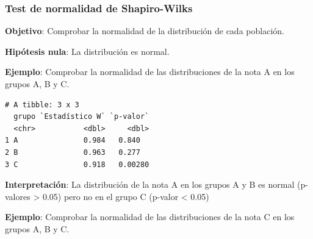 \documentclass[
  spanish,
  a4paper,
]{scrreport}
\newenvironment{Shaded}{\begin{snugshade}}{\end{snugshade}}
\newcommand{\AttributeTok}[1]{\textcolor[rgb]{0.40,0.45,0.13}{#1}}
\newcommand{\FunctionTok}[1]{\textcolor[rgb]{0.28,0.35,0.67}{#1}}
\newcommand{\NormalTok}[1]{\textcolor[rgb]{0.00,0.23,0.31}{#1}}
\newcommand{\OtherTok}[1]{\textcolor[rgb]{0.00,0.23,0.31}{#1}}
\newcommand{\SpecialCharTok}[1]{\textcolor[rgb]{0.37,0.37,0.37}{#1}}
\newcommand{\StringTok}[1]{\textcolor[rgb]{0.13,0.47,0.30}{#1}}
\theoremstyle{definition}
\theoremstyle{definition}
\theoremstyle{remark}
\begin{document}
\subsubsection{Test de normalidad de
Shapiro-Wilks}\label{test-de-normalidad-de-shapiro-wilks-2}

\textbf{Objetivo}: Comprobar la normalidad de la distribución de cada
población.

\textbf{Hipótesis nula}: La distribución es normal.

\textbf{Ejemplo}: Comprobar la normalidad de las distribuciones de la
nota A en los grupos A, B y C.

\begin{Shaded}
\end{Shaded}

\begin{verbatim}
# A tibble: 3 x 3
  grupo `Estadístico W` `p-valor`
  <chr>           <dbl>     <dbl>
1 A               0.984   0.840  
2 B               0.963   0.277  
3 C               0.918   0.00280
\end{verbatim}

\textbf{Interpretación}: La distribución de la nota A en los grupos A y
B es normal (p-valores \textgreater{} 0.05) pero no en el grupo C
(p-valor \textless{} 0.05)

\textbf{Ejemplo}: Comprobar la normalidad de las distribuciones de la
nota C en los grupos A, B y C.

\begin{Shaded}
\end{Shaded}
\end{document}
